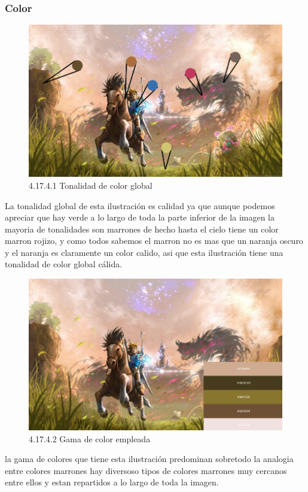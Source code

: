 \documentclass[12pt]{article}
\begin{document}
      \subsubsection{Color}


        \begin{figure}[H]
          \centering
          \includegraphics[width=\textwidth]{images/Saúl/Sección 17/EA_img17_4Color_1TonalidadGenral.png}
          \caption{\small 4.17.4.1 Tonalidad de color global}
        \end{figure}
        La tonalidad global de esta ilustración es calidad ya que aunque podemos apreciar que hay verde a lo largo de toda la parte inferior de la imagen la mayoria de tonalidades son marrones de hecho hasta el cielo tiene un color marron rojizo, y como todos sabemos el marron no es mas que un naranja oscuro y el naranja es claramente un color calido, asi que esta ilustración tiene una tonalidad de color global cálida.


        \begin{figure}[H]
          \centering
          \includegraphics[width=\textwidth]{images/Saúl/Sección 17/EA_img17_4Color_2GamaColores.png}
          \caption{\small 4.17.4.2 Gama de color empleada}
        \end{figure}
        la gama de colores que tiene esta ilustración predominan sobretodo la analogia entre colores marrones hay diversoso tipos de colores marrones muy cercanos entre ellos y estan repartidos a lo largo de toda la imagen.
\end{document}
